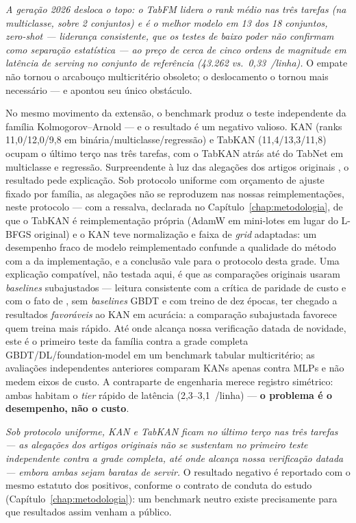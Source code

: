 \emph{A geração 2026 desloca o topo: o TabFM lidera o rank médio
nas três tarefas (na multiclasse, sobre 2 conjuntos) e é o melhor
modelo em 13 dos 18 conjuntos, zero-shot
--- liderança consistente, que os testes de baixo poder não confirmam
como separação estatística --- ao preço de cerca de cinco ordens de
magnitude em latência de
\emph{serving} no conjunto de referência (43.262 vs.\
0,33~\us/linha).} O empate não tornou o
arcabouço multicritério obsoleto; o deslocamento o
tornou mais necessário --- e apontou seu único obstáculo.

No mesmo movimento da extensão, o benchmark produz o teste independente
da família Kolmogorov--Arnold --- e o resultado é um negativo
valioso.
KAN (ranks 11,0/12,0/9,8 em binária/multiclasse/regressão) e TabKAN
(11,4/13,3/11,8) ocupam o último terço nas três tarefas, com o TabKAN
atrás até do TabNet em multiclasse e regressão. Surpreendente à luz das
alegações dos artigos originais \citep{kan2024,tabkan2025}, o resultado
pede explicação. Sob protocolo uniforme com orçamento de ajuste
fixado por família, as alegações não se reproduzem nas nossas
reimplementações, neste protocolo --- com a ressalva,
declarada no Capítulo~\ref{chap:metodologia}, de que o TabKAN é
reimplementação própria (AdamW em mini-lotes em lugar do L-BFGS
original) e o KAN teve normalização e faixa de \emph{grid}
adaptadas: um desempenho fraco de modelo reimplementado confunde a
qualidade do método com a da implementação, e a conclusão vale para o
protocolo desta grade. Uma explicação compatível, não testada aqui, é
que as comparações originais usaram \emph{baselines} subajustados ---
leitura consistente com a crítica de paridade de custo
\citep{kancritical2024} e com o fato de \citet{poeta2024},
sem \emph{baselines} GBDT e com treino de dez épocas, ter chegado a
resultados \emph{favoráveis} ao KAN em acurácia: a comparação
subajustada favorece quem treina mais rápido. Até onde alcança nossa verificação
datada de novidade, este é o primeiro teste da família contra a grade
completa GBDT/DL/foundation-model em um benchmark tabular multicritério;
as avaliações independentes anteriores
\citep{poeta2024,kancritical2024} comparam KANs apenas contra MLPs e não
medem eixos de custo. A contraparte de engenharia merece registro
simétrico: ambas habitam o \emph{tier} rápido de latência (2,3--3,1~\us/linha)
--- \textbf{o problema é o desempenho, não o
custo}.

\emph{Sob protocolo uniforme, KAN e TabKAN ficam no último terço
nas três tarefas --- as alegações dos artigos originais não se
sustentam no primeiro teste independente contra a grade completa, até
onde alcança nossa verificação datada --- embora ambas sejam baratas de
servir.} O resultado negativo é reportado com o mesmo estatuto dos positivos,
conforme o contrato de conduta do estudo
(Capítulo~\ref{chap:metodologia}): um benchmark neutro existe
precisamente para que resultados assim venham a público.

